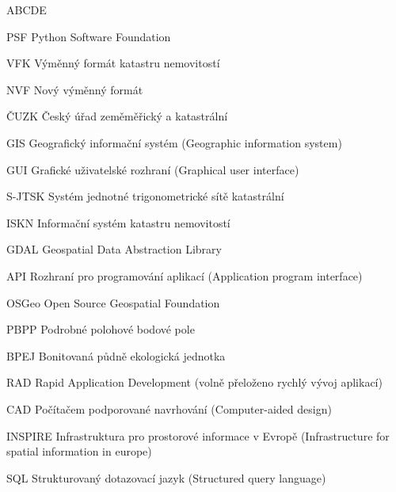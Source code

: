 
\begin{seznamzkratek}{ABCDE}

		  {PSF}
	      {Python Software Foundation}
	      
		  {VFK}
	      {Výměnný formát katastru nemovitostí}
	      
		  {NVF}
	      {Nový výměnný formát}
	      
	      {ČUZK}
	      {Český úřad zeměměřický a katastrální}

	      {GIS}
	      {Geografický informační systém (Geographic information system)}
	         
	      {GUI}
	      {Grafické uživatelské rozhraní (Graphical user interface)}
	           
	      {S-JTSK}
	      {Systém jednotné trigonometrické sítě katastrální}
	  
	      {ISKN}
	      {Informační systém katastru nemovitostí}        
	      
	      {GDAL}
	      {Geospatial Data Abstraction Library}
	      
	      {API}
	      {Rozhraní pro programování aplikací (Application program interface)}    
	      
	      {OSGeo}
	      {Open Source Geospatial Foundation}
	      
	      {PBPP}
	      {Podrobné polohové bodové pole}

	      {BPEJ}
	      {Bonitovaná půdně ekologická jednotka}
	      
	      {RAD}
	      {Rapid Application Development (volně přeloženo rychlý vývoj aplikací)}
	      
	      {CAD}
	      {Počítačem podporované navrhování (Computer-aided design)}
	      
	 	  {INSPIRE}
	 	  {Infrastruktura pro prostorové informace v Evropě (Infrastructure for spatial information in europe)}
	 	  
	 	  {SQL}
	 	  {Strukturovaný dotazovací jazyk (Structured query language)}
	        
\end{seznamzkratek}
